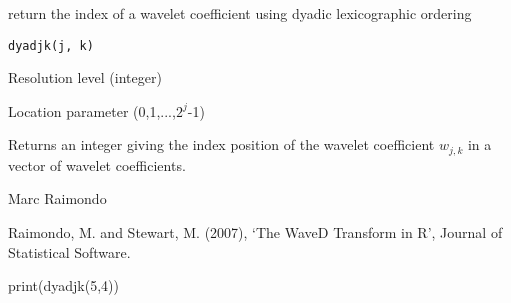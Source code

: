 \begin{Description}\relax
return the index of a
wavelet coefficient using dyadic lexicographic ordering
\end{Description}
\begin{Usage}
\begin{verbatim}
dyadjk(j, k)
\end{verbatim}
\end{Usage}
\begin{Arguments}
\begin{ldescription}
\item[\code{j}] Resolution level (integer) 
\item[\code{k}] Location parameter (0,1,...,$2^j$-1)
\end{ldescription}
\end{Arguments}
\begin{Value}
Returns an integer giving the index position
of the wavelet coefficient $w_{j,k}$ in a vector of wavelet 
coefficients.
\end{Value}
\begin{Author}\relax
Marc Raimondo
\end{Author}
\begin{References}\relax
Raimondo, M. and Stewart, M. (2007),
`The WaveD Transform in R', Journal of Statistical Software.
\end{References}
\begin{SeeAlso}\relax
{}
\end{SeeAlso}
\begin{Examples}
\begin{ExampleCode}
print(dyadjk(5,4))
  \end{ExampleCode}
\end{Examples}

